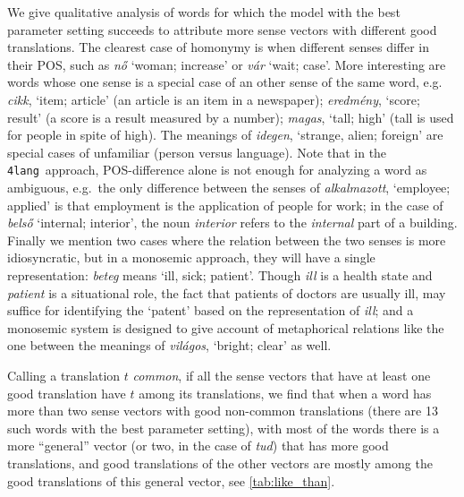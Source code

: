 \documentclass[11pt]{article}
\newcommand{\fl}{\texttt{4lang}}
\begin{document}
We give qualitative analysis of words for which the model with the best
parameter setting succeeds to attribute more sense vectors with different good
translations. The clearest case of homonymy is when different senses differ in
their POS, such as \emph{nő} `woman; increase' or \emph{vár} `wait; case'.
More interesting are words whose one sense is a special case of an other sense
of the same word, e.g.~ \emph{cikk}, `item; article' (an
article is an item in a newspaper); \emph{eredmény}, `score; result' (a score
is a result measured by a number); \emph{magas}, `tall; high' (tall is used for
people in spite of high). The meanings of \emph{idegen}, `strange, alien;
foreign' are special cases of unfamiliar (person versus language).  Note that
in the \fl~approach, POS-difference alone is not enough for analyzing a word as
ambiguous, e.g.~the only difference between the senses of \emph{alkalmazott},
`employee; applied' is that employment is the application of people for work;
in the case of \emph{belső} `internal; interior', the noun \emph{interior}
refers to the \emph{internal} part of a building. Finally we mention two cases
where the relation between the two senses is more idiosyncratic, but in a
monosemic approach, they will have a single representation: \emph{beteg} means
`ill, sick; patient'. Though \emph{ill} is a health state and \emph{patient} is
a situational role, the fact that patients of doctors are usually ill, may
suffice for identifying the `patent' based on the representation of
\emph{ill}; and a monosemic system is designed to give account of metaphorical
relations like the one between the meanings of \emph{világos}, `bright; clear'
as well.

Calling a translation $t$ \emph{common}, if all the sense vectors that have at
least one good translation have $t$ among its translations, we find that when a
word has more than two sense vectors with good non-common translations (there
are 13 such words with the best parameter setting), with most of the words
there is a more ``general'' vector (or two, in the case of \emph{tud}) that has
more good translations, and good translations of the other vectors are mostly
among the good translations of this general vector, see
\autoref{tab:like_than}.
\end{document}
